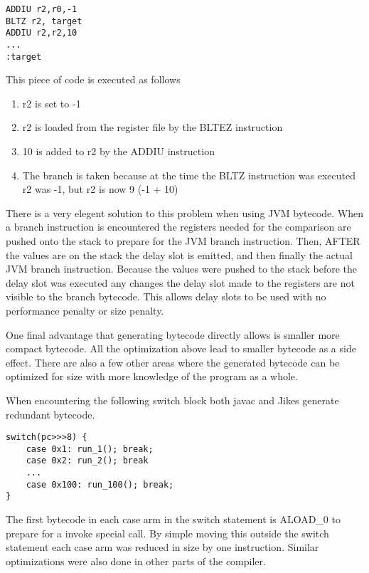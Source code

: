\documentclass{acmconf}
\begin{document}
{\footnotesize\begin{verbatim}
ADDIU r2,r0,-1
BLTZ r2, target
ADDIU r2,r2,10
...
:target
\end{verbatim}}

This piece of code is executed as follows

\begin{enumerate}

\item r2 is set to -1

\item r2 is loaded from the register file by the BLTEZ instruction
      
\item 10 is added to r2 by the ADDIU instruction

\item The branch is taken because at the time the BLTZ instruction was
      executed r2 was -1, but r2 is now 9 (-1 + 10)

\end{enumerate}

There is a very elegent solution to this problem when using JVM
bytecode. When a branch instruction is encountered the registers
needed for the comparison are pushed onto the stack to prepare for the
JVM branch instruction. Then, AFTER the values are on the stack the
delay slot is emitted, and then finally the actual JVM branch
instruction. Because the values were pushed to the stack before the
delay slot was executed any changes the delay slot made to the
registers are not visible to the branch bytecode. This allows delay
slots to be used with no performance penalty or size penalty.

One final advantage that generating bytecode directly allows is
smaller more compact bytecode. All the optimization above lead to
smaller bytecode as a side effect. There are also a few other areas
where the generated bytecode can be optimized for size with more
knowledge of the program as a whole.

When encountering the following switch block both javac and Jikes
generate redundant bytecode.

{\footnotesize\begin{verbatim}
switch(pc>>>8) {
    case 0x1: run_1(); break;
    case 0x2: run_2(); break
    ...
    case 0x100: run_100(); break;
}
\end{verbatim}}

The first bytecode in each case arm in the switch statement is ALOAD\_0 to
prepare for a invoke special call. By simple moving this outside the switch
statement each case arm was reduced in size by one instruction. Similar
optimizations were also done in other parts of the compiler.
\end{document}
